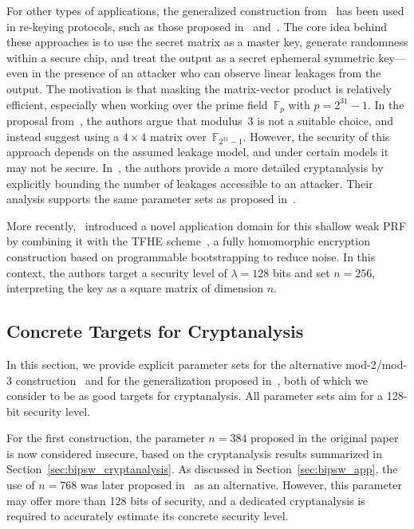 \documentclass[journal=tosc,submission]{iacrtrans}
\theoremstyle{theorem}
\newcommand\yr[1]{\textcolor{brown!80}{\textbf{Yann:} #1}}
\begin{document}
For other types of applications, the generalized construction from~\cite{C:DGHIKS21} has been used in re-keying protocols, such as those proposed in~\cite{TCHES:DMMS21} and~\cite{C:HMMRSU23}. The core idea behind these approaches is to use the secret matrix as a master key, generate randomness within a secure chip, and treat the output as a secret ephemeral symmetric key—even in the presence of an attacker who can observe linear leakages from the output. The motivation is that masking the matrix-vector product is relatively efficient, especially when working over the prime field~$\mathbb{F}_p$ with $p = 2^{31} - 1$. In the proposal from~\cite{TCHES:DMMS21}, the authors argue that modulus~3 is not a suitable choice, and instead suggest using a $4 \times 4$ matrix over~$\mathbb{F}_{2^{31}-1}$. However, the security of this approach depends on the assumed leakage model, and under certain models it may not be secure. In~\cite{C:HMMRSU23}, the authors provide a more detailed cryptanalysis by explicitly bounding the number of leakages accessible to an attacker. Their analysis supports the same parameter sets as proposed in~\cite{TCHES:DMMS21}.


More recently,~\cite{EC:ADDG24} introduced a novel application domain for this shallow weak PRF by combining it with the TFHE scheme~\cite{JC:CGGI20}, a fully homomorphic encryption construction based on programmable bootstrapping to reduce noise. In this context, the authors target a security level of $\lambda = 128$ bits and set $n = 256$, interpreting the key as a square matrix of dimension $n$.

\subsection{Concrete Targets for Cryptanalysis}
In this section, we provide explicit parameter sets for the alternative mod-2/mod-3 construction~\cite{TCC:BIPSW18} and for the generalization proposed in~\cite{C:DGHIKS21}, both of which we consider to be as good targets for cryptanalysis. All parameter sets aim for a 128-bit security level.

For the first construction, the parameter $n = 384$ proposed in the original paper is now considered insecure, based on the cryptanalysis results summarized in Section~\ref{sec:bipsw_cryptanalysis}. As discussed in Section~\ref{sec:bipsw_app}, the use of $n = 768$ was later proposed in~\cite{AC:CDDKS24} as an alternative. However, this parameter may offer more than 128 bits of security, and a dedicated cryptanalysis is required to accurately estimate its concrete security level.
\end{document}
